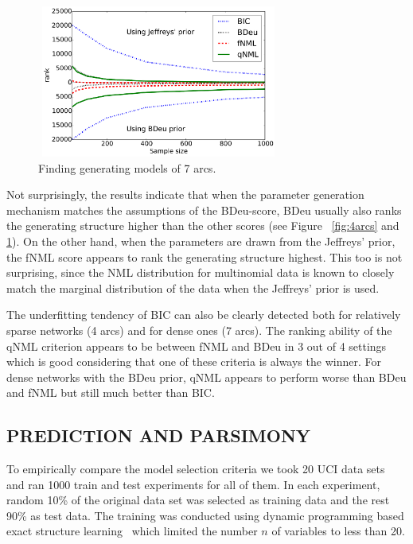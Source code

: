 \begin{figure}[h]
\centering
\includegraphics[width=8cm,height=5cm]{qNML_images/art7_mean.pdf}
\caption{Finding generating models of 7 arcs.}
\label{fig:7arcs}
\end{figure}


Not surprisingly, the results indicate that when the parameter generation
mechanism matches the assumptions of the BDeu-score, BDeu usually
also ranks the generating structure higher than the other scores (see Figure
~\ref{fig:4arcs} and \ref{fig:7arcs}).  On the other hand, when the parameters are drawn from the
Jeffreys' prior, the fNML score appears to rank the generating structure
highest. This too is not surprising, since the NML distribution for
multinomial data is known to closely match the marginal distribution of
the data when the Jeffreys' prior is used.

The underfitting tendency of BIC can also be clearly detected both for
relatively sparse networks (4 arcs) and for dense ones (7 arcs). The
ranking ability of the qNML criterion appears to be between
fNML and BDeu in 3 out of 4 settings which is good considering that
one of these criteria is always the winner. For dense networks with
the BDeu prior, qNML appears to perform worse than BDeu and fNML but
still much better than BIC.

\subsection{PREDICTION AND PARSIMONY}

To empirically compare the model selection criteria we took 20 UCI
data sets~\cite{Lichman:2013} and ran 1000 train and test experiments
for all of them. In each experiment, random 10\% of the original
data set was selected as training data and the rest 90\% as test data.
The training was conducted using dynamic programming based exact structure
learning~\cite{cosco.uai06} which limited the number $n$ of variables
to less than 20.

